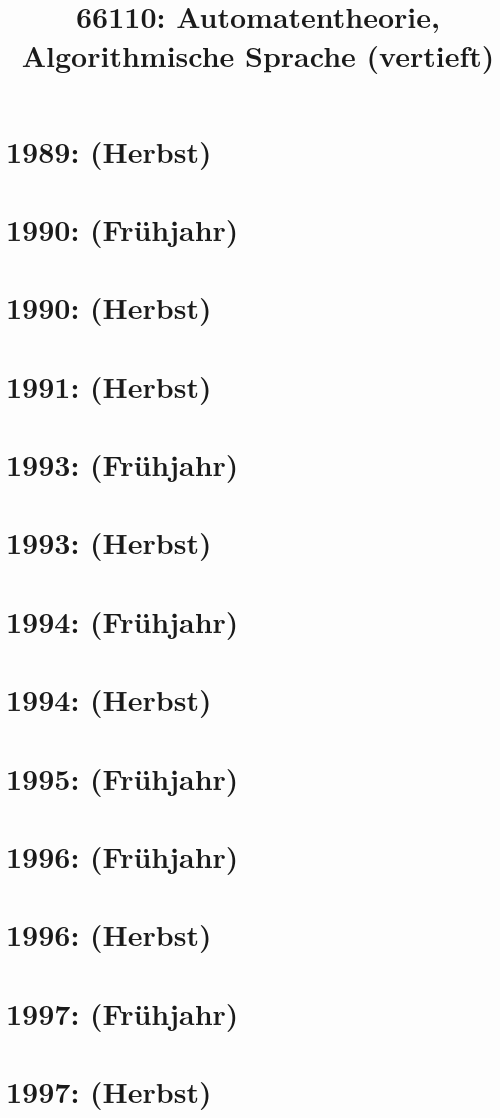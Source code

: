\documentclass{lehramt-informatik-haupt}
\title{66110: Automatentheorie, Algorithmische Sprache (vertieft)}
\begin{document}
\maketitle
\tableofcontents

\section{1989: (Herbst)}


\section{1990: (Frühjahr)}


\section{1990: (Herbst)}


\section{1991: (Herbst)}


\section{1993: (Frühjahr)}


\section{1993: (Herbst)}


\section{1994: (Frühjahr)}


\section{1994: (Herbst)}


\section{1995: (Frühjahr)}


\section{1996: (Frühjahr)}


\section{1996: (Herbst)}


\section{1997: (Frühjahr)}


\section{1997: (Herbst)}

\end{document}
